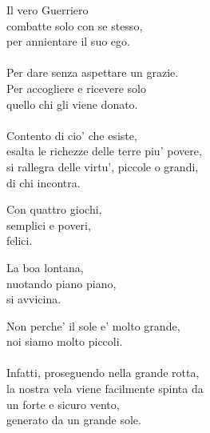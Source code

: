 \begin{haiku}
Il vero Guerriero\\
combatte solo con se stesso,\\
per annientare il suo ego.\\
\leavevmode\\
Per dare senza aspettare un grazie.\\
Per accogliere e ricevere solo\\
quello chi gli viene donato.\\
\leavevmode\\
Contento di cio' che esiste,\\
esalta le richezze delle terre piu' povere,\\
si rallegra delle virtu', piccole o grandi,\\
di chi incontra.\\
\end{haiku}

\begin{haiku}
Con quattro giochi,\\
semplici e poveri,\\
felici.\\
\end{haiku}

\begin{haiku}
La boa lontana,\\
nuotando piano piano,\\
si avvicina.\\
\end{haiku}

\begin{haiku}
Non perche' il sole e' molto grande,\\
noi siamo molto piccoli.\\
\leavevmode\\
Infatti, proseguendo nella grande rotta,\\
la nostra vela viene facilmente spinta da\\
un forte e sicuro vento,\\
generato da un grande sole.\\
\end{haiku}


